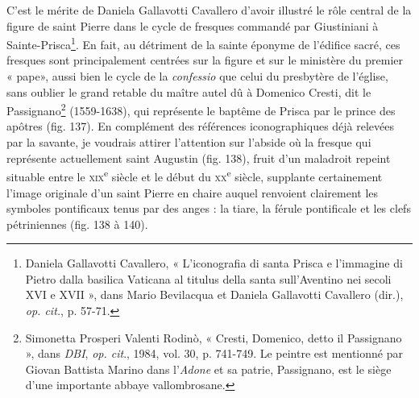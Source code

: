 \documentclass[12pt,twoside,openany]{book}
\begin{document}
C’est le mérite de Daniela Gallavotti Cavallero d’avoir illustré le rôle central de la figure de saint Pierre dans le cycle de fresques commandé par Giustiniani à Sainte-Prisca\footnote{Daniela Gallavotti Cavallero, « L’iconografia di santa Prisca e l’immagine di Pietro dalla basilica Vaticana al titulus della santa sull’Aventino nei secoli XVI e XVII », dans Mario Bevilacqua et Daniela Gallavotti Cavallero (dir.), \textit{op. cit.}, p. 57-71.}. En fait, au détriment de la sainte éponyme de l’édifice sacré, ces fresques sont principalement centrées sur la figure et sur le ministère du premier « pape», aussi bien le cycle de la \textit{confessio }que celui du presbytère de l’église, sans oublier le grand retable du maître autel dû à Domenico Cresti, dit le Passignano\footnote{Simonetta Prosperi Valenti Rodinò, « Cresti, Domenico, detto il Passignano », dans \textit{DBI}, \textit{op. cit}., 1984, vol. 30, p. 741-749. Le peintre est mentionné par Giovan Battista Marino dans l’\textit{Adone} et sa patrie, Passignano, est le siège d’une importante abbaye vallombrosane.} (1559-1638), qui représente le baptême de Prisca par le prince des apôtres (fig. 137). En complément des références iconographiques déjà relevées par la savante, je voudrais attirer l’attention sur l’abside où la fresque qui représente actuellement saint Augustin (fig. 138), fruit d’un maladroit repeint situable entre le \textsc{xix}\textsuperscript{e} siècle et le début du \textsc{xx}\textsuperscript{e} siècle, supplante certainement l’image originale d’un saint Pierre en chaire auquel renvoient clairement les symboles pontificaux tenus par des anges : la tiare, la férule pontificale et les clefs pétriniennes (fig. 138 à 140).
\end{document}
